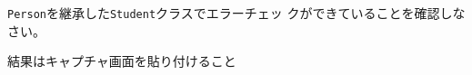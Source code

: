  \begin{Prob}\upshape\Must
  \texttt{Person}を継承した\texttt{Student}クラスでエラーチェッ
  クができていることを確認しなさい。
\end{Prob}
\ifText 結果はキャプチャ画面を貼り付けること\vspace{0.3\textheight}\fi